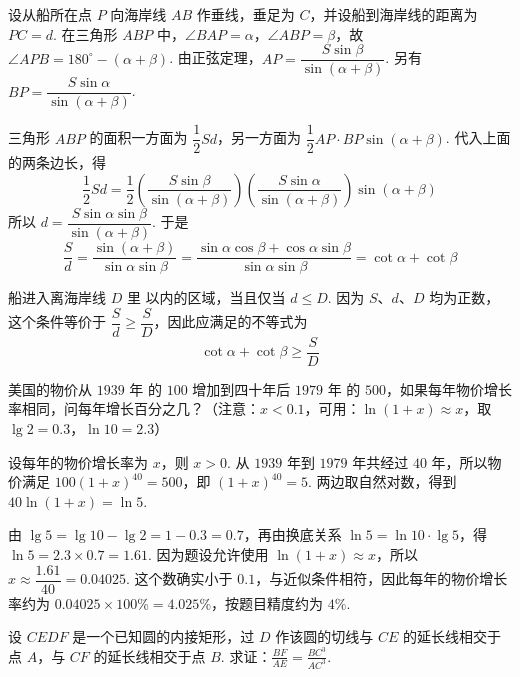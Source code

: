 \documentclass[UTF8,a4paper,oneside,11pt]{ctexbook}
\begin{document}
\begin{solution}
设从船所在点 \(P\) 向海岸线 \(AB\) 作垂线，垂足为 \(C\)，并设船到海岸线的距离为 \(PC=d\). 在三角形 \(ABP\) 中，\(\angle BAP=\alpha\)，\(\angle ABP=\beta\)，故 \(\angle APB=180^\circ-(\alpha+\beta)\). 由正弦定理，\(AP=\dfrac{S\sin\beta}{\sin(\alpha+\beta)}\). 另有 \(BP=\dfrac{S\sin\alpha}{\sin(\alpha+\beta)}\).

三角形 \(ABP\) 的面积一方面为 \(\dfrac{1}{2}Sd\)，另一方面为 \(\dfrac{1}{2}AP\cdot BP\sin(\alpha+\beta)\). 代入上面的两条边长，得
\[
\frac{1}{2}Sd=\frac{1}{2}\left(\frac{S\sin\beta}{\sin(\alpha+\beta)}\right)\left(\frac{S\sin\alpha}{\sin(\alpha+\beta)}\right)\sin(\alpha+\beta)
\]
所以 \(d=\dfrac{S\sin\alpha\sin\beta}{\sin(\alpha+\beta)}\). 于是
\[
\frac{S}{d}=\frac{\sin(\alpha+\beta)}{\sin\alpha\sin\beta}=\frac{\sin\alpha\cos\beta+\cos\alpha\sin\beta}{\sin\alpha\sin\beta}=\cot\alpha+\cot\beta
\]

船进入离海岸线 \(D\text{ 里}\) 以内的区域，当且仅当 \(d\leqslant D\). 因为 \(S\)、\(d\)、\(D\) 均为正数，这个条件等价于 \(\dfrac{S}{d}\geqslant\dfrac{S}{D}\)，因此应满足的不等式为
\[
\boxed{\cot\alpha+\cot\beta\geqslant\frac{S}{D}}
\]
\end{solution}

\begin{problem}
美国的物价从 \(1939\text{ 年}\) 的 \(100\) 增加到四十年后 \(1979\text{ 年}\) 的 \(500\)，如果每年物价增长率相同，问每年增长百分之几？（注意：\(x<0.1\)，可用：\(\ln(1 + x)\approx x\)，取 \(\lg 2 = 0.3\)，\(\ln 10 = 2.3\)）
\end{problem}

\begin{solution}
设每年的物价增长率为 \(x\)，则 \(x>0\). 从 \(1939\) 年到 \(1979\) 年共经过 \(40\) 年，所以物价满足 \(100(1+x)^{40}=500\)，即 \((1+x)^{40}=5\). 两边取自然对数，得到 \(40\ln(1+x)=\ln5\).

由 \(\lg 5=\lg10-\lg2=1-0.3=0.7\)，再由换底关系 \(\ln5=\ln10\cdot\lg5\)，得 \(\ln5=2.3\times0.7=1.61\). 因为题设允许使用 \(\ln(1+x)\approx x\)，所以 \(x\approx\dfrac{1.61}{40}=0.04025\). 这个数确实小于 \(0.1\)，与近似条件相符，因此每年的物价增长率约为 \(0.04025\times100\%=4.025\%\)，按题目精度约为 \(4\%\).
\end{solution}

\begin{problem}
设 \(CEDF\) 是一个已知圆的内接矩形，过 \(D\) 作该圆的切线与 \(CE\) 的延长线相交于点 \(A\)，与 \(CF\) 的延长线相交于点 \(B\). 求证：\(\frac{BF}{AE} = \frac{BC^{3}}{AC^{3}}\).

\end{problem}
\end{document}
